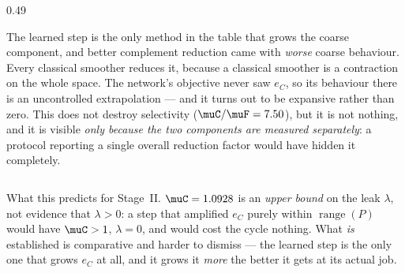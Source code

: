 \begin{columns}[T]
\begin{column}{0.49\textwidth}
\vspace{1.5mm}
\raggedright
The learned step is \alert{the only method in the table that grows the coarse component},
and better complement reduction came with \emph{worse} coarse behaviour. Every classical
smoother reduces it, because a classical smoother is a contraction on the whole space. The
network's objective never saw $e_C$, so its behaviour there is an uncontrolled
extrapolation --- and it turns out to be expansive rather than zero. This does not destroy
selectivity ($\muC/\muF=7.50$), but it is not nothing, and it is visible \emph{only because
the two components are measured separately}: a protocol reporting a single overall
reduction factor would have hidden it completely.
\end{column}
\end{columns}

\bre
What this predicts for Stage~II. $\muC=1.0928$ is an \emph{upper bound} on the leak
$\lambda$, not evidence that $\lambda>0$: a step that amplified $e_C$ purely within
$\operatorname{range}(P)$ would have $\muC>1$, $\lambda=0$, and would cost the cycle
nothing. What \emph{is} established is comparative and harder to dismiss --- the learned
step is the only one that grows $e_C$ at all, and it grows it \emph{more} the better it
gets at its actual job.
\ere
